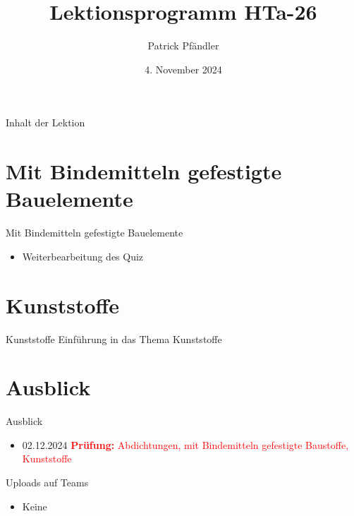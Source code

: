 



\title{\textbf{Lektionsprogramm HTa-26}}
\author{Patrick Pfändler}
\date{4. November 2024}




\frame{\titlepage}

\begin{frame}{Inhalt der Lektion}
    \tableofcontents
\end{frame}


\section{Mit Bindemitteln gefestigte Bauelemente }
\begin{frame}{Mit Bindemitteln gefestigte Bauelemente}
\begin{itemize}
	\item[\textbullet] Weiterbearbeitung des Quiz
\end{itemize}
\end{frame}


\section{Kunststoffe}
\begin{frame}{Kunststoffe}
    Einführung in das Thema Kunststoffe
\end{frame}

\section{Ausblick}
\begin{frame}{Ausblick}
	\begin{itemize}
		\item 02.12.2024 \textcolor{red}{\textbf{Prüfung:} Abdichtungen, mit Bindemitteln gefestigte Baustoffe, Kunststoffe}
	\end{itemize}
\end{frame}

\begin{frame}{Uploads auf Teams}
    \begin{itemize}
        \item Keine
    \end{itemize}
    
\end{frame}

\folieFragen

